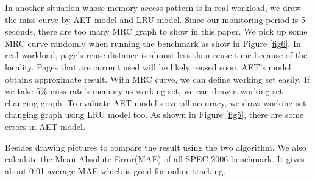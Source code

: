 \documentclass[10pt,twocolumn]{article}
\begin{document}
In another situation whose memory access pattern is in real workload, we draw the miss curve by AET model and LRU model. Since our monitoring period is 5 seconds, there are too many MRC graph to show in this paper. We pick up some MRC curve randomly when running the benchmark as show in Figure \ref{fig6}. In real workload, page's reuse distance is almost less than reuse time because of the locality. Pages that are current used will be likely reused soon. AET's model obtains approximate result. With MRC curve, we can define working set easily. If we take 5\% miss rate's memory as working set, we can draw a working set changing graph. To evaluate AET model's overall accuracy, we draw working set changing graph using LRU model too. As shown in Figure \ref{fig5}, there are some errors in AET model.%

Besides drawing pictures to compare the result using the two algorithm. We also calculate the Mean Absolute Error(MAE) of all SPEC 2006 benchmark. It gives about 0.01 average MAE which is good for online tracking.
\end{document}
